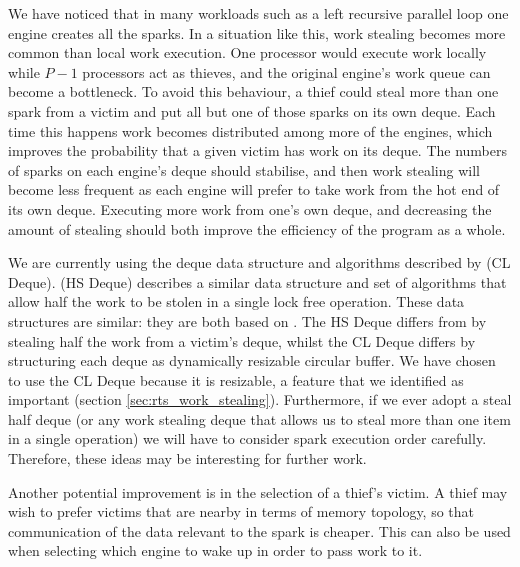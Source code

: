 We have noticed that in many workloads such as a left recursive parallel
loop one engine creates all the sparks.
In a situation like this,
work stealing becomes more common than local work execution.
One processor would execute work locally while $P - 1$ processors act as
thieves,
and the original engine's work queue can become a bottleneck.
To avoid this behaviour,
a thief could steal more than one spark from a victim and put all but one of
those sparks on its own deque.
Each time this happens work becomes distributed among more of the engines,
which improves the probability that a given victim has work on its deque.
The numbers of sparks on each engine's deque should stabilise,
and then work stealing will become less frequent as each engine will prefer to
take work from the hot end of its own deque.
Executing more work from one's own deque, and decreasing the amount of stealing
should both improve the efficiency of the program as a whole.

We are currently using the deque data structure and algorithms described by
\citet{Chase_2005_wsdeque} (CL Deque).
\citet{hendler:2002:stealhalf} (HS Deque) describes a similar data structure
and set of algorithms that allow half the work to be stolen in a single lock
free operation.
These data structures are similar:
they are both based on \citet{arora:1998:work-stealing}.
The HS Deque differs from 
\citet{arora:1998:work-stealing}
by stealing half the work from a victim's deque,
whilst the CL Deque differs by structuring each deque as
dynamically resizable circular buffer.
We have chosen to use the CL Deque because it is resizable,
a feature that we identified as important (section \ref{sec:rts_work_stealing}).
Furthermore,
if we ever adopt a steal half deque (or any work stealing deque that allows
us to steal more than one item in a single operation) we will have to
consider spark execution order carefully.
Therefore,
these ideas may be interesting for further work.

Another potential improvement is in the selection of a thief's victim.
A thief may wish to prefer victims that are nearby in terms of memory
topology, so that communication of the data relevant to the spark is
cheaper.
This can also be used when selecting which engine to wake up in order to
pass work to it.


